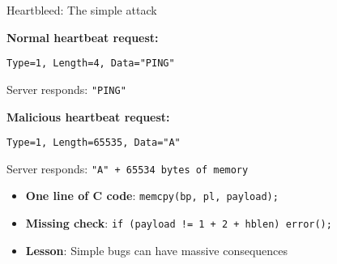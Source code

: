 \documentclass[aspectratio=169, lualatex, handout]{beamer}
\begin{document}
\begin{frame}{Heartbleed: The simple attack}
	\begin{center}
		\textbf{Normal heartbeat request:}
	\end{center}
	\begin{center}
		\texttt{Type=1, Length=4, Data="PING"}
	\end{center}
	\begin{center}
		Server responds: \texttt{"PING"}
	\end{center}
	\pause
	\begin{center}
		\textbf{Malicious heartbeat request:}
	\end{center}
	\begin{center}
		\texttt{Type=1, Length=65535, Data="A"}
	\end{center}
	\begin{center}
		Server responds: \texttt{"A" + 65534 bytes of memory}
	\end{center}
	\pause
	\begin{itemize}
		\item \textbf{One line of C code}: \texttt{memcpy(bp, pl, payload);}
		\item \textbf{Missing check}: \texttt{if (payload != 1 + 2 + hblen) error();}
		\item \textbf{Lesson}: Simple bugs can have massive consequences
	\end{itemize}
\end{frame}
\end{document}
